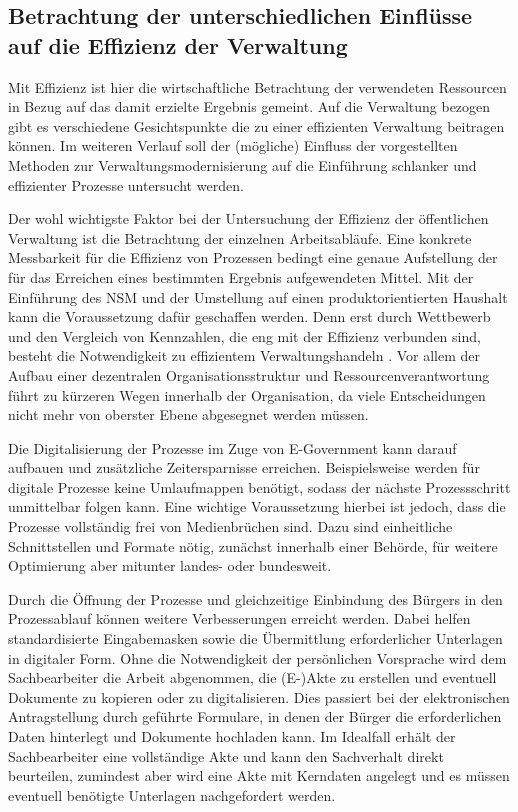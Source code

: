 \subsection{Betrachtung der unterschiedlichen Einflüsse auf die Effizienz der Verwaltung}
Mit Effizienz ist hier die wirtschaftliche Betrachtung der verwendeten Ressourcen in Bezug auf das damit erzielte Ergebnis gemeint.
Auf die Verwaltung bezogen gibt es verschiedene Gesichtspunkte die zu einer effizienten Verwaltung beitragen können.
Im weiteren Verlauf soll der (mögliche) Einfluss der vorgestellten Methoden zur Verwaltungsmodernisierung auf die Einführung schlanker und effizienter Prozesse untersucht werden.

Der wohl wichtigste Faktor bei der Untersuchung der Effizienz der öffentlichen Verwaltung ist die Betrachtung der einzelnen Arbeitsabläufe.
Eine konkrete Messbarkeit für die Effizienz von Prozessen bedingt eine genaue Aufstellung der für das Erreichen eines bestimmten Ergebnis aufgewendeten Mittel.
Mit der Einführung des NSM und der Umstellung auf einen produktorientierten Haushalt kann die Voraussetzung dafür geschaffen werden.
Denn erst durch Wettbewerb und den Vergleich von Kennzahlen, die eng mit der Effizienz verbunden sind, besteht die Notwendigkeit zu effizientem Verwaltungshandeln \cite[][]{Jann2019}.
Vor allem der Aufbau einer dezentralen Organisationsstruktur und Ressourcenverantwortung führt zu kürzeren Wegen innerhalb der Organisation, da viele Entscheidungen nicht mehr von oberster Ebene abgesegnet werden müssen.

Die Digitalisierung der Prozesse im Zuge von E-Government kann darauf aufbauen und zusätzliche Zeitersparnisse erreichen.
Beispielsweise werden für digitale Prozesse keine Umlaufmappen benötigt, sodass der nächste Prozessschritt unmittelbar folgen kann.
Eine wichtige Voraussetzung hierbei ist jedoch, dass die Prozesse vollständig frei von Medienbrüchen sind.
Dazu sind einheitliche Schnittstellen und Formate nötig, zunächst innerhalb einer Behörde, für weitere Optimierung aber mitunter landes- oder bundesweit.

Durch die Öffnung der Prozesse und gleichzeitige Einbindung des Bürgers in den Prozessablauf können weitere Verbesserungen erreicht werden.
Dabei helfen standardisierte Eingabemasken sowie die Übermittlung erforderlicher Unterlagen in digitaler Form.
Ohne die Notwendigkeit der persönlichen Vorsprache wird dem Sachbearbeiter die Arbeit abgenommen, die (E-)Akte zu erstellen und eventuell Dokumente zu kopieren oder zu digitalisieren.
Dies passiert bei der elektronischen Antragstellung durch geführte Formulare, in denen der Bürger die erforderlichen Daten hinterlegt und Dokumente hochladen kann.
Im Idealfall erhält der Sachbearbeiter eine vollständige Akte und kann den Sachverhalt direkt beurteilen, zumindest aber wird eine Akte mit Kerndaten angelegt und es müssen eventuell benötigte Unterlagen nachgefordert werden.

